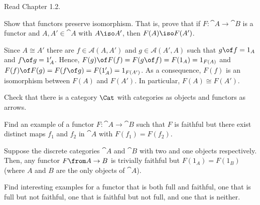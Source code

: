 \def\pathToRoot{../../}

\newcommand{\A}{\cat A}
\newcommand{\B}{\cat B}
\newcommand{\M}{\cat M}
\newcommand{\Rel}{\fcat{Rel}}




\author{Mostafa Ahmed Abdelfattah Abouhamra, Felix Rech, Dominik Wagner}

\begin{hint}
  Read Chapter 1.2.
\end{hint}

\begin{exercise}
Show that functors preserve isomorphism. That is, prove that if $F : \cat{A} \to \cat{B}$ is a functor and $A, A' \in \cat{A}$ with $A \iso A'$, then $F(A) \iso F(A')$.
\end{exercise}

\begin{answer}
  Since $A\cong A'$ there are $f\in\mathscr A(A,A')$ and $g\in\mathscr A(A',A)$ such that $g \of f=1_A$ and $f \of g=1_A'$. Hence, $F(g)\of F(f)=F(g\of f)=F(1_A)=1_{F(A)}$ and $F(f)\of F(g)=F(f\of g)=F(1_A')=1_{F(A')}$. As a consequence, $F(f)$ is an isomorphism between $F(A)$ and $F(A')$. In particular, $F(A)\cong F(A')$.
\end{answer}

\begin{exercise}
  Check that there is a category $\Cat$ with categories as objects and functors as arrows.
\end{exercise}

\begin{exercise}
  Find an example of a functor $F : \cat{A} \to \cat{B}$ such that $F$ is faithful but there exist distinct maps $f_1$ and $f_2$ in $\cat{A}$ with $F(f_1) = F(f_2)$.
\end{exercise}

\begin{answer}
  Suppose the discrete categories $\A$ and $\B$ with two and one objects respectively. Then, any functor $F\from A\to B$ is trivially faithful but $F(1_A)=F(1_B)$ (where $A$ and $B$ are the only objects of $\A$).
\end{answer}

\begin{exercise}
  Find interesting examples for a functor that is both full and faithful, one that is full but not faithful, one that is faithful but not full, and one that is neither.
\end{exercise}

